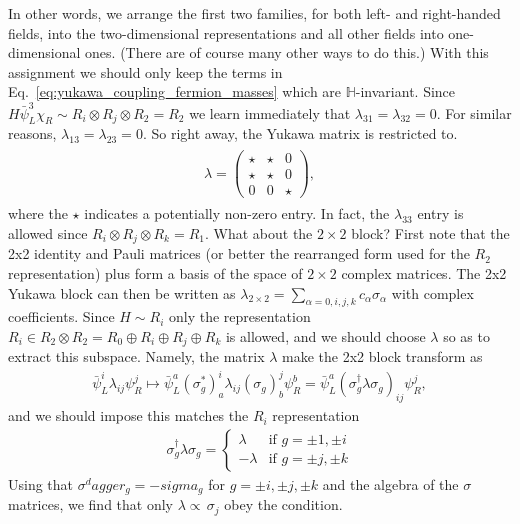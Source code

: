 \begin{mytheorem}
In other words, we arrange the first two families, for both left- and right-handed fields, into the two-dimensional representations and all other fields into one-dimensional ones.
(There are of course many other ways to do this.)
With this assignment we should only keep the terms in Eq.~\eqref{eq:yukawa_coupling_fermion_masses} which are $\mathbb{H}$-invariant.
Since $H \bar{\psi}_{L}^{3} \chi_{R} \sim R_{i} \otimes R_{j} \otimes R_{2}=R_{2}$ we learn immediately that $\lambda_{31}=\lambda_{32}=0$.
For similar reasons, $\lambda_{13}=\lambda_{23}=0$.
So right away, the Yukawa matrix is restricted to.
\begin{align}
\begin{aligned}
    \lambda=\begin{pmatrix}
        \star & \star & 0 \\
        \star & \star & 0 \\
        0 & 0 & \star
    \end{pmatrix} ,
\end{aligned}
\end{align}
where the $\star$ indicates a potentially non-zero entry.
In fact, the $\lambda_{33}$ entry is allowed since $R_{i} \otimes R_{j} \otimes R_{k}=R_{1}$.
What about the $2 \times 2$ block?
First note that the 2x2 identity and Pauli matrices (or better the rearranged form used for the $R_2$ representation) plus  form a basis of the space of $2 \times 2$ complex matrices.
The 2x2 Yukawa block can then be written as $\lambda_{2 \times 2}=\sum_{\alpha=0, i, j, k} c_{\alpha} \sigma_{\alpha}$ with complex coefficients.
Since $H \sim R_{i}$ only the representation $R_{i} \in R_{2} \otimes R_{2}= R_0\oplus R_i \oplus R_j \oplus R_k$ is allowed, and we should choose $\lambda$ so as to extract this subspace.
Namely, the matrix $\lambda$ make the 2x2 block transform as
\begin{align}
  \bar{\psi}_L^i\lambda_{ij}\psi_R^j\mapsto \bar{\psi}_L^a (\sigma_g^*)^i_a\lambda_{ij}(\sigma_g)^j_b \psi_R^b = \bar{\psi}_L^a (\sigma_g^\dagger \lambda \sigma_g)_{ij} \psi_R^j,
\end{align}
and we should impose this matches the $R_i$ representation
\begin{align}
  \sigma_g^\dagger \lambda \sigma_g = \begin{cases}
  \lambda & \text{if } g=\pm1, \pm i \\[2pt]
  -\lambda & \text{if } g=\pm j,\pm k
  \end{cases}
\end{align}
Using that $\sigma^dagger_g=-sigma_g$ for $g=\pm i, \pm j, \pm k$ and the algebra of the $\sigma$ matrices, we find that only $\lambda \propto\, \sigma_j$ obey the condition.

\end{mytheorem}
